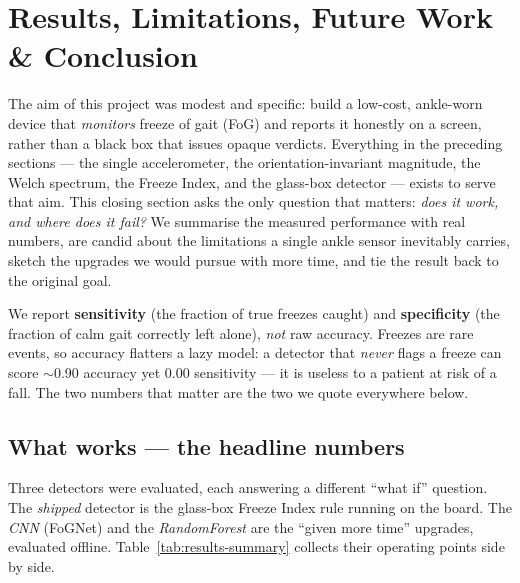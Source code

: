 \section{Results, Limitations, Future Work \& Conclusion}
\label{sec:results-future}

The aim of this project was modest and specific: build a low-cost, ankle-worn device
that \emph{monitors} freeze of gait (FoG) and reports it honestly on a screen, rather
than a black box that issues opaque verdicts. Everything in the preceding sections ---
the single accelerometer, the orientation-invariant magnitude, the Welch spectrum, the
Freeze Index, and the glass-box detector --- exists to serve that aim. This closing
section asks the only question that matters: \emph{does it work, and where does it
fail?} We summarise the measured performance with real numbers, are candid about the
limitations a single ankle sensor inevitably carries, sketch the upgrades we would
pursue with more time, and tie the result back to the original goal.

\begin{keyidea}
We report \textbf{sensitivity} (the fraction of true freezes caught) and
\textbf{specificity} (the fraction of calm gait correctly left alone), \emph{not} raw
accuracy. Freezes are rare events, so accuracy flatters a lazy model: a detector that
\emph{never} flags a freeze can score $\sim$0.90 accuracy yet 0.00 sensitivity --- it
is useless to a patient at risk of a fall. The two numbers that matter are the two we
quote everywhere below.
\end{keyidea}

\subsection{What works --- the headline numbers}

Three detectors were evaluated, each answering a different ``what if'' question. The
\emph{shipped} detector is the glass-box Freeze Index rule running on the board. The
\emph{CNN} (FoGNet) and the \emph{RandomForest} are the ``given more time'' upgrades,
evaluated offline. Table~\ref{tab:results-summary} collects their operating points side
by side.

